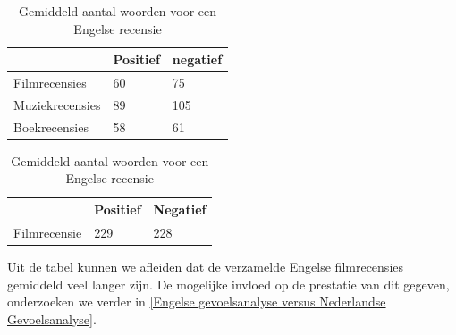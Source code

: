 \begin{table}[h]
\centering
\setlength\tabcolsep{2pt}
\begin{minipage}[t]{0.48\textwidth}
\centering

\begin{tabular}{l|l|l|}
\cline{2-3}
                & Positief & negatief \\ \hline
\multicolumn{1}{|l|}{Filmrecensies}   & 60       & 75       \\ \hline
\multicolumn{1}{|l|}{Muziekrecensies} & 89       & 105      \\ \hline
\multicolumn{1}{|l|}{Boekrecensies}   & 58       & 61    \\ \hline   
\end{tabular}

\caption{Gemiddeld aantal woorden voor een Nederlandse recensie} 
\label{tabel: Gemiddeld aantal woorden per recensie Nederlands}
\end{minipage}%
\hfill
\begin{minipage}[t]{0.48\textwidth}
\centering

\begin{tabular}{l|l|l|}
\cline{2-3}
                                   & Positief & Negatief \\ \hline
\multicolumn{1}{|l|}{Filmrecensie} & 229      & 228      \\ \hline
\end{tabular}
\caption{Gemiddeld aantal woorden voor een Engelse recensie}
\label{tabel: Gemiddeld aantal woorden per recensie Engels}
\end{minipage}
\end{table} 

Uit de tabel kunnen we afleiden dat de verzamelde Engelse filmrecensies gemiddeld veel langer zijn. De mogelijke invloed op de prestatie van dit gegeven, onderzoeken we verder in \ref{Engelse gevoelsanalyse versus Nederlandse Gevoelsanalyse}.

